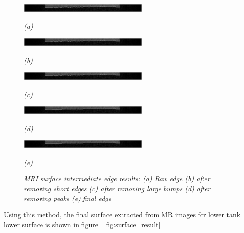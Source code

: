 \begin{figure}[htb]
  \begin{minipage}[b]{2.5in}
    \centering
    \centerline{\mbox{\includegraphics[width=2.5in]{data_extraction/images/MRI/1_raw.eps}}}
    \centerline{\emph{(a)}}
  \end{minipage}
  \begin{minipage}[b]{2.5in}
    \centering
    \centerline{\mbox{\includegraphics[width=2.5in]{data_extraction/images/MRI/2_remove_short_edges.eps}}}
    \centerline{\emph{(b)}}
  \end{minipage}
  \begin{minipage}[b]{2.5in}
    \centering
    \centerline{\mbox{\includegraphics[width=2.5in]{data_extraction/images/MRI/3_remove_large_bumps.eps}}}
    \centerline{\emph{(c)}}
  \end{minipage}
  \begin{minipage}[b]{2.5in}
    \centering
    \centerline{\mbox{\includegraphics[width=2.5in]{data_extraction/images/MRI/4_removed_peaks.eps}}}
    \centerline{\emph{(d)}}
  \end{minipage}
  \begin{minipage}[b]{2.5in}
    \centering
    \centerline{\mbox{\includegraphics[width=2.5in]{data_extraction/images/MRI/5_final_edge.eps}}}
    \centerline{\emph{(e)}}
  \end{minipage}
  \caption{\emph{MRI surface intermediate edge results: (a) Raw edge (b) after removing short edges (c) after removing large bumps (d) after removing peaks (e) final edge}}
  \label{fig:mri_edge_results}
\end{figure}

Using this method, the final surface extracted from MR images for lower tank lower surface is shown in figure
~\ref{fig:surface_result}

